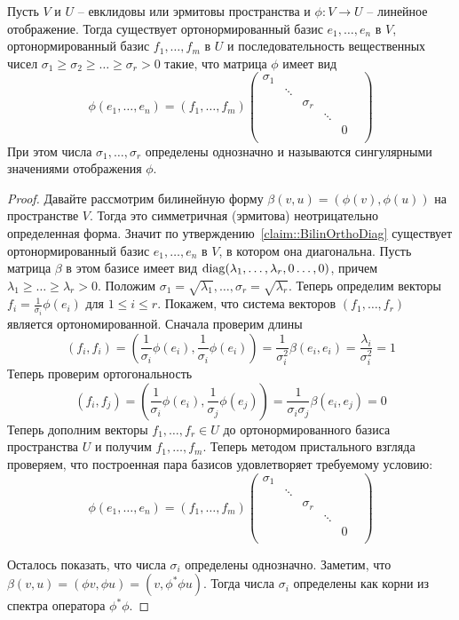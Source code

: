 \begin{claim}\label{claim::HermEuclHomClass}
Пусть $V$ и $U$ -- евклидовы или эрмитовы пространства и $\phi\colon V\to U$ -- линейное отображение. Тогда
существует ортонормированный базис $e_1,\ldots,e_n$ в $V$, ортонормированный базис $f_1,\ldots,f_m$ в $U$ и последовательность вещественных чисел $\sigma_1\geqslant \sigma_2 \geqslant \ldots \geqslant \sigma_r > 0$ такие, что матрица $\phi$ имеет вид
\[
\phi(e_1,\ldots,e_n) = (f_1,\ldots,f_m) 
\begin{pmatrix}
{\sigma_1}&{}&{}&{}&{}&{}\\
{}&{\ddots}&{}&{}&{}&{}\\
{}&{}&{\sigma_r}&{}&{}&{}\\
{}&{}&{}&{\ddots}&{}&{}\\
{}&{}&{}&{}&{0}&{}\\
\end{pmatrix}
\]
При этом числа $\sigma_1,\ldots,\sigma_r$ определены однозначно и называются сингулярными значениями отображения $\phi$.
\end{claim}
\begin{proof}
Давайте рассмотрим билинейную форму $\beta(v, u) = (\phi(v), \phi(u))$ на пространстве $V$. Тогда это симметричная (эрмитова) неотрицательно определенная форма. Значит по утверждению~\ref{claim::BilinOrthoDiag} существует ортонормированный базис $e_1,\ldots,e_n$ в $V$, в котором она диагональна. Пусть матрица $\beta$ в этом базисе имеет вид $\operatorname{diag}(\lambda_1,\ldots,\lambda_r,0\ldots,0)$, причем $\lambda_1\geqslant \ldots \geqslant \lambda_r>0$. Положим $\sigma_1 = \sqrt{\lambda_1},\ldots,\sigma_r = \sqrt{\lambda_r}$. Теперь определим векторы $f_i = \frac{1}{\sigma_i}\phi(e_i)$ для $1\leqslant i\leqslant r$. Покажем, что система векторов $(f_1,\ldots,f_r)$ является ортономированной. Сначала проверим длины
\[
(f_i, f_i) = \left(\frac{1}{\sigma_i}\phi(e_i), \frac{1}{\sigma_i} \phi(e_i)\right) = \frac{1}{\sigma_i^2}\beta(e_i, e_i) = \frac{\lambda_i}{\sigma_i^2} = 1
\]
Теперь проверим ортогональность
\[
(f_i, f_j) = \left(\frac{1}{\sigma_i}\phi(e_i), \frac{1}{\sigma_j} \phi(e_j)\right) = \frac{1}{\sigma_i\sigma_j}\beta(e_i, e_j) = 0
\]
Теперь дополним векторы $f_1,\ldots,f_r\in U$ до ортонормированного базиса пространства $U$ и получим $f_1,\ldots,f_m$. Теперь методом пристального взгляда проверяем, что построенная пара базисов удовлетворяет требуемому условию:
\[
\phi(e_1,\ldots,e_n) = (f_1,\ldots,f_m) 
\begin{pmatrix}
{\sigma_1}&{}&{}&{}&{}&{}\\
{}&{\ddots}&{}&{}&{}&{}\\
{}&{}&{\sigma_r}&{}&{}&{}\\
{}&{}&{}&{\ddots}&{}&{}\\
{}&{}&{}&{}&{0}&{}\\
\end{pmatrix}
\]

Осталось показать, что числа $\sigma_i$ определены однозначно. Заметим, что $\beta(v, u) = (\phi v, \phi u) = (v, \phi^* \phi u)$. Тогда числа $\sigma_i$ определены как корни из спектра оператора $\phi^*\phi$.
\end{proof}


